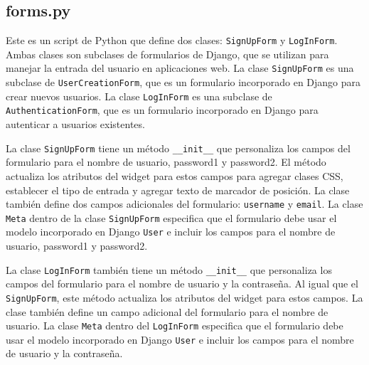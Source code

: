 \documentclass{article}
\begin{document}
	\subsection{forms.py}
	Este es un script de Python que define dos clases: \texttt{SignUpForm} y \texttt{LogInForm}. Ambas clases son subclases de formularios de Django, que se utilizan para manejar la entrada del usuario en aplicaciones web. La clase \texttt{SignUpForm} es una subclase de \texttt{UserCreationForm}, que es un formulario incorporado en Django para crear nuevos usuarios. La clase \texttt{LogInForm} es una subclase de \texttt{AuthenticationForm}, que es un formulario incorporado en Django para autenticar a usuarios existentes.

La clase \texttt{SignUpForm} tiene un método \texttt{\_\_init\_\_} que personaliza los campos del formulario para el nombre de usuario, password1 y password2. El método actualiza los atributos del widget para estos campos para agregar clases CSS, establecer el tipo de entrada y agregar texto de marcador de posición. La clase también define dos campos adicionales del formulario: \texttt{username} y \texttt{email}. La clase \texttt{Meta} dentro de la clase \texttt{SignUpForm} especifica que el formulario debe usar el modelo incorporado en Django \texttt{User} e incluir los campos para el nombre de usuario, password1 y password2.

La clase \texttt{LogInForm} también tiene un método \texttt{\_\_init\_\_} que personaliza los campos del formulario para el nombre de usuario y la contraseña. Al igual que el \texttt{SignUpForm}, este método actualiza los atributos del widget para estos campos. La clase también define un campo adicional del formulario para el nombre de usuario. La clase \texttt{Meta} dentro del \texttt{LogInForm} especifica que el formulario debe usar el modelo incorporado en Django \texttt{User} e incluir los campos para el nombre de usuario y la contraseña.



		
\end{document}
